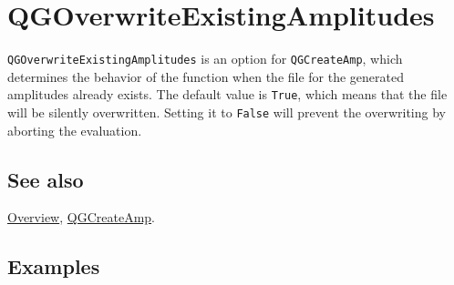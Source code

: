 \documentclass[../FeynHelpersManual.tex]{subfiles}
\begin{document}
\hypertarget{qgoverwriteexistingamplitudes}{
\section{QGOverwriteExistingAmplitudes}\label{qgoverwriteexistingamplitudes}}

\texttt{QGOverwriteExistingAmplitudes} is an option for
\texttt{QGCreateAmp}, which determines the behavior of the function when
the file for the generated amplitudes already exists. The default value
is \texttt{True}, which means that the file will be silently
overwritten. Setting it to \texttt{False} will prevent the overwriting
by aborting the evaluation.

\subsection{See also}

\hyperlink{toc}{Overview}, \hyperlink{qgcreateamp}{QGCreateAmp}.

\subsection{Examples}
\end{document}
